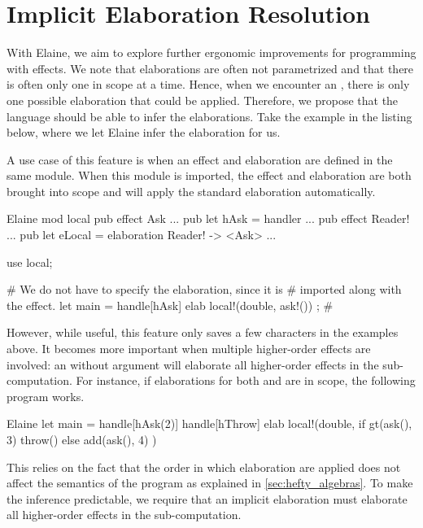 \chapter{Implicit Elaboration Resolution}\label{chap:elabres}

With Elaine, we aim to explore further ergonomic improvements for programming with effects. We note that elaborations are often not parametrized and that there is often only one in scope at a time. Hence, when we encounter an , there is only one possible elaboration that could be applied. Therefore, we propose that the language should be able to infer the elaborations. Take the example in the listing below, where we let Elaine infer the elaboration for us.


A use case of this feature is when an effect and elaboration are defined in the same module. When this module is imported, the effect and elaboration are both brought into scope and  will apply the standard elaboration automatically.

\begin{lst}{Elaine}
mod local {
    pub effect Ask { ... }
    pub let hAsk = handler { ... }
    pub effect Reader! { ... }
    pub let eLocal = elaboration Reader! -> <Ask> { ... }
}

use local;

# We do not have to specify the elaboration, since it is
# imported along with the effect.
let main = handle[hAsk] elab { local!(double, ask!()) };
#                          ^^^
\end{lst}
%
However, while useful, this feature only saves a few characters in the examples above. It becomes more important when multiple higher-order effects are involved: an  without argument will elaborate all higher-order effects in the sub-computation. For instance, if elaborations for both  and  are in scope, the following program works.

\begin{lst}{Elaine}
let main = handle[hAsk(2)] handle[hThrow] elab {
    local!(double, {
        if gt(ask(), 3) {
            throw() 
        } else {
            add(ask(), 4)
        }
    })
}
\end{lst}
%
This relies on the fact that the order in which elaboration are applied does not affect the semantics of the program as explained in \cref{sec:hefty_algebras}. To make the inference predictable, we require that an implicit elaboration must elaborate all higher-order effects in the sub-computation.

